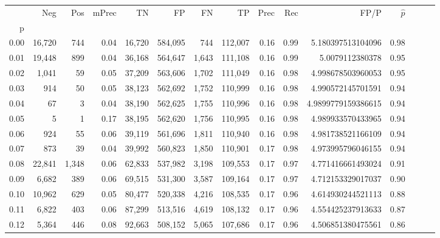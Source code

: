 \begin{tabular}{rrrrrrrrrrrrrrr}
\toprule
{} &     Neg &    Pos & mPrec &       TN &       FP &       FN &       TP &  Prec &   Rec &                  FP/P & $\hat{p}$ \\
p    &         &        &       &          &          &          &          &       &       &                       &           \\
\midrule
0.00 &  16,720 &    744 &  0.04 &   16,720 &  584,095 &      744 &  112,007 &  0.16 &  0.99 &     5.180397513104096 &      0.98 \\
0.01 &  19,448 &    899 &  0.04 &   36,168 &  564,647 &    1,643 &  111,108 &  0.16 &  0.99 &       5.0079112380378 &      0.95 \\
0.02 &   1,041 &     59 &  0.05 &   37,209 &  563,606 &    1,702 &  111,049 &  0.16 &  0.98 &     4.998678503960053 &      0.95 \\
0.03 &     914 &     50 &  0.05 &   38,123 &  562,692 &    1,752 &  110,999 &  0.16 &  0.98 &     4.990572145701591 &      0.94 \\
0.04 &      67 &      3 &  0.04 &   38,190 &  562,625 &    1,755 &  110,996 &  0.16 &  0.98 &    4.9899779159386615 &      0.94 \\
0.05 &       5 &      1 &  0.17 &   38,195 &  562,620 &    1,756 &  110,995 &  0.16 &  0.98 &     4.989933570433965 &      0.94 \\
0.06 &     924 &     55 &  0.06 &   39,119 &  561,696 &    1,811 &  110,940 &  0.16 &  0.98 &     4.981738521166109 &      0.94 \\
0.07 &     873 &     39 &  0.04 &   39,992 &  560,823 &    1,850 &  110,901 &  0.17 &  0.98 &     4.973995796046155 &      0.94 \\
0.08 &  22,841 &  1,348 &  0.06 &   62,833 &  537,982 &    3,198 &  109,553 &  0.17 &  0.97 &     4.771416661493024 &      0.91 \\
0.09 &   6,682 &    389 &  0.06 &   69,515 &  531,300 &    3,587 &  109,164 &  0.17 &  0.97 &     4.712153329017037 &      0.90 \\
0.10 &  10,962 &    629 &  0.05 &   80,477 &  520,338 &    4,216 &  108,535 &  0.17 &  0.96 &     4.614930244521113 &      0.88 \\
0.11 &   6,822 &    403 &  0.06 &   87,299 &  513,516 &    4,619 &  108,132 &  0.17 &  0.96 &     4.554425237913633 &      0.87 \\
0.12 &   5,364 &    446 &  0.08 &   92,663 &  508,152 &    5,065 &  107,686 &  0.17 &  0.96 &     4.506851380475561 &      0.86 \\

\end{tabular}
